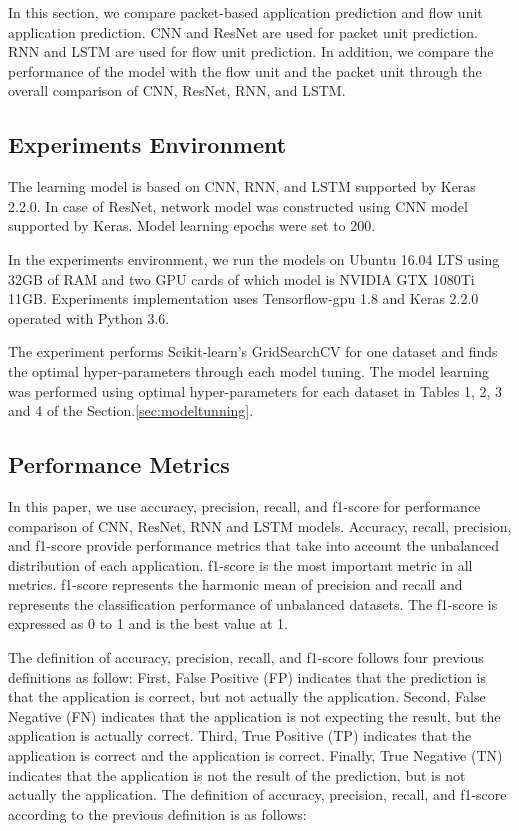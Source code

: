 In this section, we compare packet-based application prediction and flow unit application prediction.
CNN and ResNet are used for packet unit prediction.
RNN and LSTM are used for flow unit prediction.
In addition, we compare the performance of the model with the flow unit and the packet unit through the overall comparison of CNN, ResNet, RNN, and LSTM.

\subsection{Experiments Environment}
The learning model is based on CNN, RNN, and LSTM supported by Keras 2.2.0.
In case of ResNet, network model was constructed using CNN model supported by Keras.
Model learning epochs were set to 200.

In the experiments environment, we run the models on Ubuntu 16.04 LTS using 32GB of RAM and two GPU cards of which model is NVIDIA GTX 1080Ti 11GB.
Experiments implementation uses Tensorflow-gpu 1.8 and Keras 2.2.0 operated with Python 3.6.

The experiment performs Scikit-learn's GridSearchCV for one dataset and finds the optimal hyper-parameters through each model tuning.
The model learning was performed using optimal hyper-parameters for each dataset in Tables 1, 2, 3 and 4 of the Section.\ref{sec:modeltunning}.

\subsection{Performance Metrics}
In this paper, we use accuracy, precision, recall, and f1-score for performance comparison of CNN, ResNet, RNN and LSTM models.
Accuracy, recall, precision, and f1-score provide performance metrics that take into account the unbalanced distribution of each application.
f1-score is the most important metric in all metrics.
f1-score represents the harmonic mean of precision and recall and represents the classification performance of unbalanced datasets.
The f1-score is expressed as 0 to 1 and is the best value at 1.

The definition of accuracy, precision, recall, and f1-score follows four previous definitions as follow:
First, False Positive (FP) indicates that the prediction is that the application is correct, but not actually the application.
Second, False Negative (FN) indicates that the application is not expecting the result, but the application is actually correct.
Third, True Positive (TP) indicates that the application is correct and the application is correct.
Finally, True Negative (TN) indicates that the application is not the result of the prediction, but is not actually the application.
The definition of accuracy, precision, recall, and f1-score according to the previous definition is as follows:

